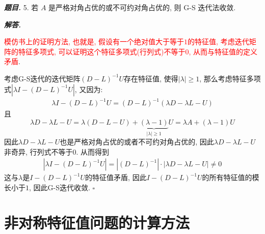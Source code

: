 \documentclass[10pt, a4paper, oneside]{ctexart}
\newenvironment{problem}{\begin{framed}\par\noindent\textbf{\textit{题目. }}}{\end{framed}\par}
\newenvironment{solution}{%
  \par\noindent\textbf{\textit{解答. }}\ignorespaces
}{%
  \hfill\ensuremath{\square}\par %
}
\begin{document}
\begin{problem}
    5. 若 $A$ 是严格对角占优的或不可约对角占优的, 则 G-S 迭代法收敛.
\end{problem}
\begin{solution}
\textcolor{red}{模仿书上的证明方法, 也就是, 假设有一个绝对值大于等于$1$的特征值, 考虑迭代矩阵的特征多项式, 可以证明这个特征多项式(行列式)不等于$0$, 从而与特征值的定义矛盾}.

考虑G-S迭代的迭代矩阵$(D-L)^{-1}U$存在特征值, 使得$|\lambda|\geq 1$, 那么考虑特征多项式$|\lambda I -(D-L)^{-1}U |$, 又因为:
\begin{align*}
    \lambda I-(D-L)^{-1}U=(D-L)^{-1}(\lambda D-\lambda L -U)
\end{align*}
且 
$$\lambda D-\lambda L -U=\lambda(D-L-U)+\underbrace{(\lambda-1)}_{|\lambda|\geq 1}U=\lambda A+(\lambda-1)U$$
因此$\lambda D-\lambda L -U$也是严格对角占优的或者不可约对角占优的, 因此$\lambda D-\lambda L -U$非奇异, 行列式不等于$0$. 从而得到 
\begin{align*}
    |\lambda I-(D-L)^{-1}U|
    =|(D-L)^{-1}|\cdot|\lambda D-\lambda L -U|\neq 0
\end{align*}
这与$\lambda$是$I-(D-L)^{-1}U$的特征值矛盾, 因此$I-(D-L)^{-1}U$的所有特征值的模长小于$1$, 因此G-S迭代收敛.
\end{solution}

\section{非对称特征值问题的计算方法}
\end{document}
